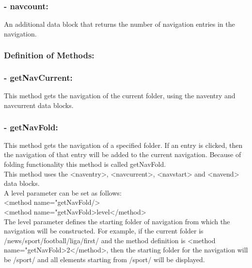 \subsubsection{- navcount:} 

  An additional data block that returns the number of navigation 
entries in the navigation. \\
\subsubsection{Definition of Methods:}
\subsubsection{- getNavCurrent:} 
  This method gets the navigation of the current folder, using the 
{\name naventry} and {\name navcurrent} data blocks.\\

\subsubsection{- getNavFold:} 

  This method gets the navigation of a specified folder. If an entry 
is clicked, then the navigation of that entry will be added to the 
current navigation. Because of folding functionality this method 
is called getNavFold. \\
  This method uses the {\tag <naventry>}, {\tag <navcurrent>}, 
{\tag <navstart>} and {\tag <navend>} data blocks. \\

  A level parameter can be set as follows: \\
  {\tag <method name="getNavFold/>} \\
  {\tag <method name="getNavFold>level</method>} \\

  The level parameter defines the starting folder of navigation from 
which the navigation will be constructed. For example, if the current 
folder is {\dir /news/sport/foot\-ball/li\-ga/first/} and the method 
definition is {\tag <method name="getNavFold>2</method>}, then the 
starting folder for the navigation will be {\dir /sport/} and all 
elements starting from {\tag /sport/} will be displayed.\\

